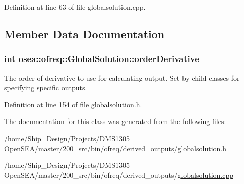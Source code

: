 Definition at line 63 of file globalsolution.\-cpp.



\subsection{Member Data Documentation}
\hypertarget{classosea_1_1ofreq_1_1_global_solution_a935843ad9f4fd2de2a2ec407de45a20d}{
\subsubsection[{order\-Derivative}]{\setlength{\rightskip}{0pt plus 5cm}int osea\-::ofreq\-::\-Global\-Solution\-::order\-Derivative\hspace{0.3cm}{\ttfamily [protected]}}}\label{classosea_1_1ofreq_1_1_global_solution_a935843ad9f4fd2de2a2ec407de45a20d}


The order of derivative to use for calculating output. Set by child classes for specifying specific outputs. 



Definition at line 154 of file globalsolution.\-h.



The documentation for this class was generated from the following files\-:\begin{DoxyCompactItemize}
\item 
/home/\-Ship\-\_\-\-Design/\-Projects/\-D\-M\-S1305 Open\-S\-E\-A/master/200\-\_\-src/bin/ofreq/derived\-\_\-outputs/\hyperlink{globalsolution_8h}{globalsolution.\-h}\item 
/home/\-Ship\-\_\-\-Design/\-Projects/\-D\-M\-S1305 Open\-S\-E\-A/master/200\-\_\-src/bin/ofreq/derived\-\_\-outputs/\hyperlink{globalsolution_8cpp}{globalsolution.\-cpp}\end{DoxyCompactItemize}
